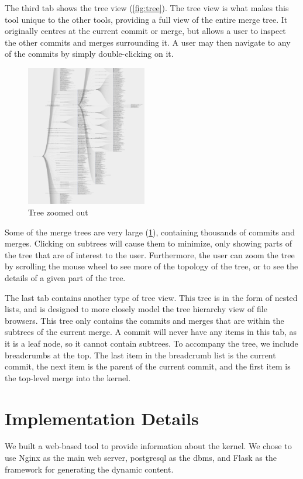 \documentclass[conference, draftclsnofoot]{IEEEtran}
\begin{document}
The third tab shows the tree view (\ref{fig:tree}). The tree view is what makes
this tool unique to the other tools, providing a full view of the entire merge
tree. It originally centres at the current commit or merge, but allows a
user to inspect the other commits and merges surrounding it. A user may then
navigate to any of the commits by simply double-clicking on it.

\begin{figure}[h]
	\centering
	\includegraphics[width=0.47\textwidth]{figures/tree_zoom.png}
	\caption{Tree zoomed out}
	\label{fig:zoomed_tree}
\end{figure}

Some of the merge trees are very large (\ref{fig:zoomed_tree}), containing
thousands of commits and merges. Clicking on subtrees will cause them to
minimize, only showing parts of the tree that are of interest to the user.
Furthermore, the user can zoom the tree by scrolling the mouse wheel to see
more of the topology of the tree, or to see the details of a given part of the
tree.

The last tab contains another type of tree view. This tree is in the form of
nested lists, and is designed to more closely model the tree hierarchy view of
file browsers. This tree only contains the commits and merges that are within
the subtrees of the current merge. A commit will never have any items in this
tab, as it is a leaf node, so it cannot contain subtrees. To accompany the
tree, we include breadcrumbs at the top. The last item in the breadcrumb list
is the current commit, the next item is the parent of the current commit, and
the first item is the top-level merge into the kernel.

\section{Implementation Details}
We built a web-based tool to provide information about the kernel.
We chose to use Nginx as the main web server, postgresql as the dbms, and Flask
as the framework for generating the dynamic content.
\end{document}
